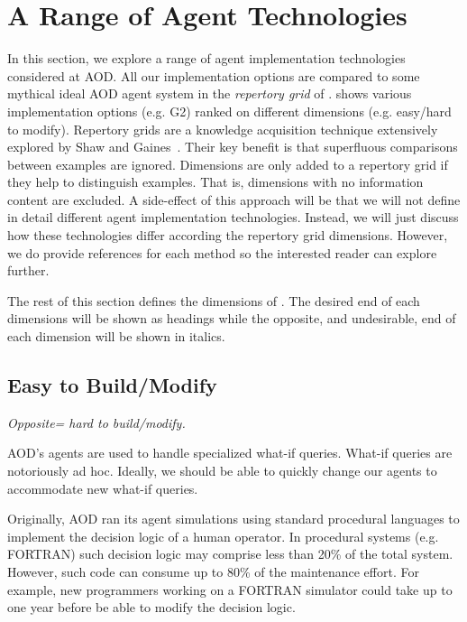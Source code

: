 \section{A Range of Agent Technologies}

In this section, we explore a range of  agent implementation
technologies considered at AOD. All our implementation options are
compared to some mythical ideal AOD agent system  in the {\em
repertory grid} of .  shows various
implementation options (e.g. G2) ranked on different dimensions
(e.g. easy/hard to modify).  Repertory grids are a knowledge
acquisition technique extensively explored by Shaw and
Gaines~\cite{shaw97,gaines89}. Their key benefit is that
superfluous  comparisons between examples are ignored. Dimensions
are only added to a repertory grid if they help to distinguish
examples. That is, dimensions with no information content are
excluded. A side-effect of this approach will be that we will not
define in detail different agent implementation technologies.
Instead, we will just discuss how these technologies differ
according the repertory grid dimensions.  However, we do provide
references for each method so the interested reader can explore
further.

The rest of this section defines the dimensions of .
The desired end of each dimensions will be shown as headings while
the opposite, and undesirable, end of each dimension will be shown
in italics.



\subsection{Easy to Build/Modify}\label{sec:mod}

{\em Opposite= hard to build/modify.}

AOD's agents are used to handle specialized what-if queries.
What-if queries are notoriously ad hoc. Ideally, we should be able
to quickly change our agents to accommodate new what-if queries.

Originally, AOD ran its agent simulations using standard
procedural languages to implement the decision logic of a human
operator. In procedural systems (e.g. FORTRAN) such decision logic
may comprise less than 20\% of the total system. However, such
code can consume up to 80\% of the maintenance effort. For
example, new programmers working on a FORTRAN  simulator could
take up to one year before be able to modify the decision logic.

